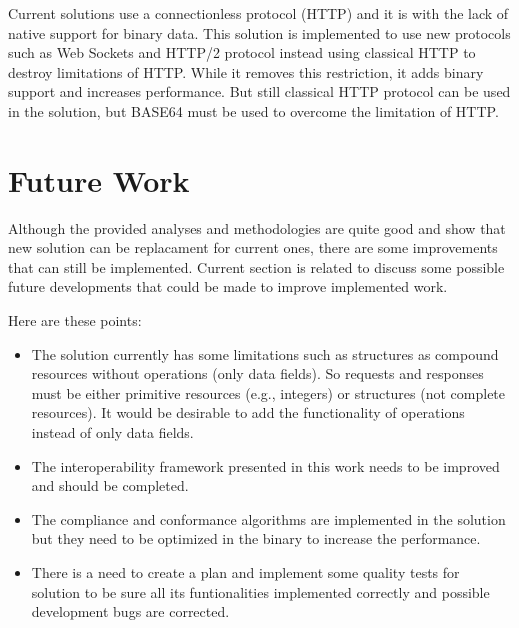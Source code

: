 Current solutions use a connectionless protocol (HTTP) and it is with the lack of native support for binary data. This solution is implemented to use new protocols such as Web Sockets and HTTP/2 protocol instead using classical HTTP to destroy limitations of HTTP. While it removes this restriction, it adds binary support and increases performance. But still classical HTTP protocol can be used in the solution, but BASE64 must be used to overcome the limitation of HTTP.


\section{Future Work}
\label{section:future}

Although the provided analyses and methodologies are quite good and show that new solution can be replacament for current ones, there are some improvements that can still be implemented. Current section is related to discuss some possible future developments that could be made to improve implemented work.

Here are these points:

\begin{itemize}

\item The solution currently has some limitations such as structures as compound resources without operations (only data fields). So requests and responses must be either primitive resources (e.g., integers) or structures (not complete resources). It would be desirable to add the functionality of operations instead of only data fields.

\item The interoperability framework presented in this work needs to be improved and should be completed.

\item The compliance and conformance algorithms are implemented in the solution but they need to be optimized in the binary to increase the performance.

\item There is a need to create a plan and implement some quality tests for solution to be sure all its funtionalities implemented correctly and possible development bugs are corrected.

\end{itemize}
